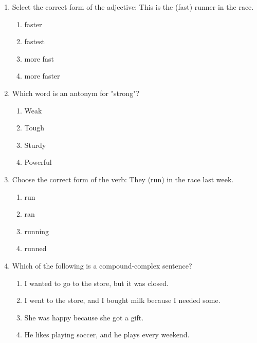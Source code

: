 \documentclass[12pt]{article}
\begin{document}
\begin{enumerate}
    \item Select the correct form of the adjective: This is the \underline{\hspace{2cm}} (fast) runner in the race.
    \begin{enumerate}[label=\Alph*.]
        \item faster
        \item fastest
        \item more fast
        \item more faster
    \end{enumerate}
    \vspace{0.5cm}

    \item Which word is an antonym for "strong"?
    \begin{enumerate}[label=\Alph*.]
        \item Weak
        \item Tough
        \item Sturdy
        \item Powerful
    \end{enumerate}
    \vspace{0.5cm}

    \item Choose the correct form of the verb: They \underline{\hspace{2cm}} (run) in the race last week.
    \begin{enumerate}[label=\Alph*.]
        \item run
        \item ran
        \item running
        \item runned
    \end{enumerate}
    \vspace{0.5cm}

    \item Which of the following is a compound-complex sentence?
    \begin{enumerate}[label=\Alph*.]
        \item I wanted to go to the store, but it was closed.
        \item I went to the store, and I bought milk because I needed some.
        \item She was happy because she got a gift.
        \item He likes playing soccer, and he plays every weekend.
    \end{enumerate}
    \vspace{0.5cm}


\end{enumerate}
\end{document}
